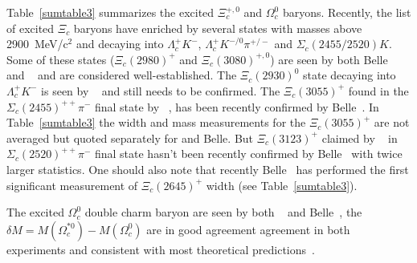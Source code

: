 Table~\ref{sumtable3} summarizes the excited $\Xi_c^{+,0}$ and $\Omega_c^0$ 
baryons. Recently, the list of excited $\Xi_c$ baryons have enriched by 
several states with masses above 2900~MeV/c$^2$ and decaying into 
$\Lambda_c^+ K^-$, $\Lambda_c^+ K^{-/0}\pi^{+/-}$ and $\Sigma_c(2455/2520) K$. 
Some of these states ($\Xi_c(2980)^+$ and $\Xi_c(3080)^{+,0}$) are seen by both Belle~\cite{Chistov:2006zj,YKato:2014} 
and \babar~\cite{Aubert:2007dt} and are considered well-established.
The $\Xi_c(2930)^0$ state decaying into 
$\Lambda_c^+ K^-$ is seen by \babar~\cite{Aubert:2007eb} 
and still needs to be confirmed.  
The $\Xi_c(3055)^+$ found in the $\Sigma_c(2455)^{++}\pi^-$ final state by \babar~\cite{Aubert:2007dt}, 
has been recently confirmed by Belle~\cite{YKato:2014}. 
In Table~\ref{sumtable3} the width and mass measurements for the $\Xi_c(3055)^+$ 
are not averaged but quoted separately for \babar and Belle. 
But $\Xi_c(3123)^+$ claimed by \babar~\cite{Aubert:2007dt} in 
$\Sigma_c(2520)^{++}\pi^-$ final state hasn't been recently
confirmed by Belle~\cite{YKato:2014} with twice larger statistics.   
One should also note that recently Belle~\cite{YKato:2014} 
has performed the first significant measurement of $\Xi_c(2645)^+$ width (see Table~\ref{sumtable3}). 




The excited $\Omega_c^0$ double charm baryon are seen by both 
\babar~\cite{Aubert:2006je} and Belle~\cite{Solovieva:2008fw}, the 
$\delta M=M(\Omega_c^{*0})-M(\Omega_c^0)$ are in good agreement 
agreement in both experiments and consistent with most theoretical 
predictions~\cite{Rosner:1995yu,Glozman:1995xy,Jenkins:1996de,
Burakovsky:1997vm}. 
   

